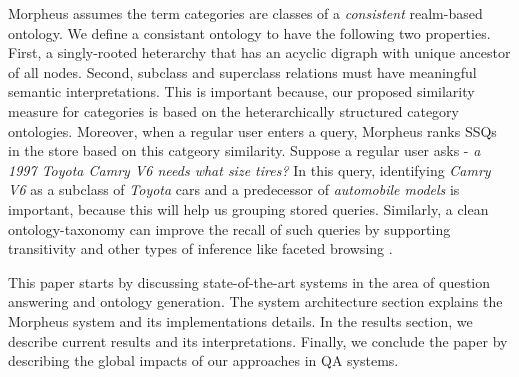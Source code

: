 Morpheus assumes the term categories are classes of a
\textit{consistent} realm-based ontology. We define a consistant ontology to have the following two properties. First, a singly-rooted heterarchy that has an acyclic digraph with unique ancestor of all nodes. Second, subclass and superclass relations must have meaningful semantic interpretations. This is important because, our proposed similarity 
measure for categories is based on the heterarchically
structured category ontologies. Moreover, when a regular user enters a query,
Morpheus ranks SSQs in the store based on this catgeory similarity. Suppose a
regular user asks -\textit{ a 1997 Toyota Camry V6 needs what size tires?} In
this query, identifying \textit{Camry V6} as a subclass of \textit{Toyota} cars
and a predecessor of \textit{automobile models} is important, because this will
help us grouping stored queries. Similarly, a clean ontology-taxonomy can
improve the recall of such queries by supporting transitivity and other types of
inference like faceted browsing \cite{Wu2008}.   


This paper starts by discussing state-of-the-art systems in the area of
question answering and ontology generation. The system
architecture section explains the Morpheus system and its implementations
details. In the results section, we describe current results and its
interpretations. Finally, we conclude the paper by describing the global impacts
of our approaches in QA systems.
